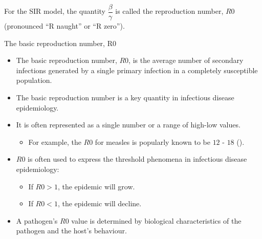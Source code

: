 \documentclass[
  ignorenonframetext,
]{beamer}
\providecommand{\tightlist}{%
  \setlength{\itemsep}{0pt}\setlength{\parskip}{0pt}}\usepackage{longtable,booktabs,array}
\begin{document}
\begin{frame}
For the SIR model, the quantity {\(\dfrac{\beta}{\gamma}\)} is called
the {reproduction number, \(R0\)} (pronounced ``R naught'' or ``R
zero'').
\end{frame}

\begin{frame}
\begin{block}{The basic reproduction number, R0}
\label{the-basic-reproduction-number-r0}
\begin{itemize}
\item
  The basic reproduction number, {\(R0\)}, is the average number of
  secondary infections generated by a {single primary infection} in a
  {completely susceptible} population.
\item
  The basic reproduction number is a key quantity in infectious disease
  epidemiology.
\end{itemize}
\end{block}
\end{frame}

\begin{frame}
\begin{itemize}
\tightlist
\item
  It is often represented as a single number or a range of high-low
  values.

  \begin{itemize}
  \tightlist
  \item
    For example, the \(R0\) for measles is popularly known to be \(12\)
    - \(18\)
    ().
  \end{itemize}
\end{itemize}
\end{frame}

\begin{frame}
\begin{itemize}
\tightlist
\item
  \(R0\) is often used to express the threshold phenomena in infectious
  disease epidemiology:

  \begin{itemize}
  \tightlist
  \item
    If \(R0 > 1\), the epidemic will grow.
  \item
    If \(R0 < 1\), the epidemic will decline.
  \end{itemize}
\item
  A pathogen's \(R0\) value is determined by biological characteristics
  of the pathogen and the host's behaviour.
\end{itemize}
\end{frame}
\end{document}
